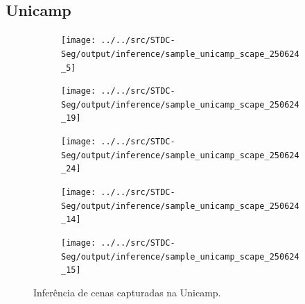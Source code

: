 \documentclass[conference]{IEEEtran}
\begin{document}
\subsection{Unicamp}

\begin{figure}[H]
	
	\begin{subfigure}[H]{\linewidth}
		\centering
		\texttt{[image: ../../src/STDC-Seg/output/inference/sample\_unicamp\_scape\_250624\_5]}
		\caption{}
		\label{fig:sample_unicamp_scape_250624_5}
	\end{subfigure}
	
	\begin{subfigure}[H]{\linewidth}
		\centering
		\texttt{[image: ../../src/STDC-Seg/output/inference/sample\_unicamp\_scape\_250624\_19]}
		\caption{}
		\label{fig:sample_unicamp_scape_250624_19}
	\end{subfigure}
	
	\begin{subfigure}[H]{\linewidth}
		\centering
		\texttt{[image: ../../src/STDC-Seg/output/inference/sample\_unicamp\_scape\_250624\_24]}
		\caption{}
		\label{fig:sample_unicamp_scape_250624_24}
	\end{subfigure}

	\begin{subfigure}[H]{\linewidth}
		\centering
		\texttt{[image: ../../src/STDC-Seg/output/inference/sample\_unicamp\_scape\_250624\_14]}
		\caption{}
		\label{fig:sample_unicamp_scape_250624_14}
	\end{subfigure}
	
	\begin{subfigure}[H]{\linewidth}
		\centering
		\texttt{[image: ../../src/STDC-Seg/output/inference/sample\_unicamp\_scape\_250624\_15]}
		\caption{}
		\label{fig:sample_unicamp_scape_250624_15}
	\end{subfigure}



	\caption{Inferência de cenas capturadas na Unicamp.}
	\label{fig:result_unicamp1}
\end{figure}
\end{document}
